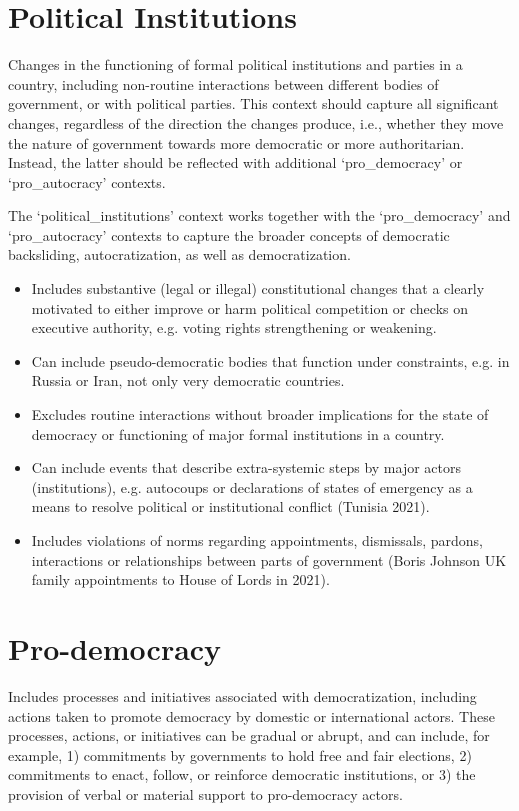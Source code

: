 \documentclass[11pt]{report}
\begin{document}
\section{Political Institutions}\label{context:political-institutions}

Changes in the functioning of formal political institutions and parties in a country, including non-routine interactions between different bodies of government, or with political parties. This context should capture all significant changes, regardless of the direction the changes produce, i.e., whether they move the nature of government towards more democratic or more authoritarian. Instead, the latter should be reflected with additional `pro\_democracy' or `pro\_autocracy' contexts.

The `political\_institutions' context works together with the  `pro\_democracy' and    `pro\_autocracy' contexts to capture the broader concepts of democratic backsliding, autocratization, as well as democratization.

\begin{itemize}
\item Includes substantive (legal or illegal) constitutional changes that a clearly motivated to either improve or harm political competition or checks on executive authority, e.g. voting rights strengthening or weakening.
\item Can include pseudo-democratic bodies that function under constraints, e.g. in Russia or Iran, not only very democratic countries.
\item Excludes routine interactions without broader implications for the state of democracy or functioning of major formal institutions in a country.
\item Can include events that describe extra-systemic steps by major actors (institutions), e.g. autocoups or declarations of states of emergency as a means to resolve political or institutional conflict (Tunisia 2021).
\item Includes violations of norms regarding appointments, dismissals, pardons, interactions or relationships between parts of government (Boris Johnson UK family appointments to House of Lords in 2021).
\end{itemize}

\section{Pro-democracy}\label{context:pro-democracy}

Includes processes and initiatives associated with democratization, including actions taken to promote democracy by domestic or international actors. These processes, actions, or initiatives can be gradual or abrupt, and can include, for example, 1) commitments by governments to hold free and fair elections, 2) commitments to enact, follow, or reinforce democratic institutions, or 3) the provision of verbal or material support to pro-democracy actors.
\end{document}
